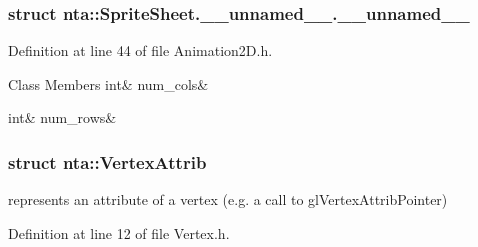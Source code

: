 \subsubsection{struct nta\+:\+:Sprite\+Sheet.\+\_\+\+\_\+unnamed\+\_\+\+\_\+.\+\_\+\+\_\+unnamed\+\_\+\+\_\+}


Definition at line 44 of file Animation2\+D.\+h.

\begin{DoxyFields}{Class Members}
\mbox{\label{namespacenta_a2ec7686cdf35752083c4cb22b93e362e}} 
int&
num\_cols&
\\
\hline

\mbox{\label{namespacenta_ab428d91d44d86e0b79d1a3193951b762}} 
int&
num\_rows&
\\
\hline

\end{DoxyFields}
\label{structnta_1_1VertexAttrib}
\subsubsection{struct nta\+:\+:Vertex\+Attrib}
represents an attribute of a vertex (e.\+g. a call to gl\+Vertex\+Attrib\+Pointer) 

Definition at line 12 of file Vertex.\+h.



